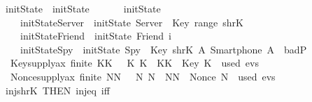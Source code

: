 \begin{isabellebody}
  \isadelimdocument
  \endisadelimdocument
  \isatagdocument
  \isamarkuptrue%
  \endisatagdocument
  {\isafolddocument}%
  \isadelimdocument
  \endisadelimdocument
  \isamarkupfalse%
  \ initState\ {\isasymequiv}\ initState\isanewline
  \ \ \isanewline
  \ \ \isamarkupfalse%
  \ initState\ \isanewline
  \ \ \ \ initState{\isacharunderscore}Server\ {\isacharcolon}\ {\isachardoublequoteopen}initState\ Server\ {\isacharequal}\ {\isacharparenleft}Key{\isacharbackquote}\ {\isacharparenleft}range\ shrK{\isacharparenright}{\isacharparenright}{\isachardoublequoteclose}\ {\isacharbar}\isanewline
  \ \ \ \ initState{\isacharunderscore}Friend\ {\isacharcolon}\ {\isachardoublequoteopen}initState\ {\isacharparenleft}Friend\ i{\isacharparenright}\ {\isacharequal}\ {\isacharbraceleft}{\isacharbraceright}{\isachardoublequoteclose}\ {\isacharbar}\isanewline
  \ \ \ \ initState{\isacharunderscore}Spy\ {\isacharcolon}\ {\isachardoublequoteopen}initState\ Spy\ {\isacharequal}\ {\isacharparenleft}Key{\isacharbackquote}\ {\isacharparenleft}shrK{\isacharbackquote}\ {\isacharbraceleft}A{\isachardot}\ Smartphone\ A\ {\isasymin}\ badP{\isacharbraceright}{\isacharparenright}{\isacharparenright}{\isachardoublequoteclose}\isanewline
  \isamarkupfalse%
  \isanewline
  \isanewline
  \isamarkupfalse%
  \ \isanewline
  \ \ Key{\isacharunderscore}supply{\isacharunderscore}ax{\isacharcolon}\ {\isachardoublequoteopen}finite\ KK\ {\isasymLongrightarrow}\ {\isasymexists}\ K{\isachardot}\ K\ {\isasymnotin}\ KK\ {\isacharampersand}\ Key\ K\ {\isasymnotin}\ used\ evs\ {\isachardoublequoteclose}\ \isanewline
  \ \ \isanewline
  \ \ \isanewline
  \ \ Nonce{\isacharunderscore}supply{\isacharunderscore}ax{\isacharcolon}\ {\isachardoublequoteopen}finite\ NN\ {\isasymLongrightarrow}\ {\isasymexists}\ N{\isachardot}\ N\ {\isasymnotin}\ NN\ {\isacharampersand}\ Nonce\ N\ {\isasymnotin}\ used\ evs{\isachardoublequoteclose}%
  \isadelimdocument
  \endisadelimdocument
  \isatagdocument
  \isamarkuptrue%
  \endisatagdocument
  {\isafolddocument}%
  \isadelimdocument
  \endisadelimdocument
  \isamarkupfalse%
  \ inj{\isacharunderscore}shrK\ {\isacharbrackleft}THEN\ inj{\isacharunderscore}eq{\isacharcomma}\ iff{\isacharbrackright}\isanewline
  \isanewline
  \isanewline
  \isamarkupfalse%

\end{isabellebody}
